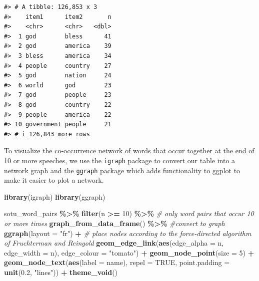 \documentclass[
]{book}
\newenvironment{Shaded}{\begin{snugshade}}{\end{snugshade}}
\newcommand{\AttributeTok}[1]{\textcolor[rgb]{0.13,0.29,0.53}{#1}}
\newcommand{\CommentTok}[1]{\textcolor[rgb]{0.56,0.35,0.01}{\textit{#1}}}
\newcommand{\ConstantTok}[1]{\textcolor[rgb]{0.56,0.35,0.01}{#1}}
\newcommand{\DecValTok}[1]{\textcolor[rgb]{0.00,0.00,0.81}{#1}}
\newcommand{\FloatTok}[1]{\textcolor[rgb]{0.00,0.00,0.81}{#1}}
\newcommand{\FunctionTok}[1]{\textcolor[rgb]{0.13,0.29,0.53}{\textbf{#1}}}
\newcommand{\NormalTok}[1]{#1}
\newcommand{\SpecialCharTok}[1]{\textcolor[rgb]{0.81,0.36,0.00}{\textbf{#1}}}
\newcommand{\StringTok}[1]{\textcolor[rgb]{0.31,0.60,0.02}{#1}}
\begin{document}
\begin{verbatim}
#> # A tibble: 126,853 x 3
#>    item1      item2       n
#>    <chr>      <chr>   <dbl>
#>  1 god        bless      41
#>  2 god        america    39
#>  3 bless      america    34
#>  4 people     country    27
#>  5 god        nation     24
#>  6 world      god        23
#>  7 god        people     23
#>  8 god        country    22
#>  9 people     america    22
#> 10 government people     21
#> # i 126,843 more rows
\end{verbatim}

To visualize the co-occurrence network of words that occur together at the end of 10 or more speeches, we use the \texttt{igraph} package to convert our table into a network graph and the \texttt{ggraph} package which adds functionality to ggplot to make it easier to plot a network.

\begin{Shaded}
\begin{Highlighting}[]
\FunctionTok{library}\NormalTok{(igraph)}
\FunctionTok{library}\NormalTok{(ggraph)}

\NormalTok{sotu\_word\_pairs }\SpecialCharTok{\%\textgreater{}\%} 
  \FunctionTok{filter}\NormalTok{(n }\SpecialCharTok{\textgreater{}=} \DecValTok{10}\NormalTok{) }\SpecialCharTok{\%\textgreater{}\%}  \CommentTok{\# only word pairs that occur 10 or more times}
  \FunctionTok{graph\_from\_data\_frame}\NormalTok{() }\SpecialCharTok{\%\textgreater{}\%} \CommentTok{\#convert to graph}
  \FunctionTok{ggraph}\NormalTok{(}\AttributeTok{layout =} \StringTok{"fr"}\NormalTok{) }\SpecialCharTok{+} \CommentTok{\# place nodes according to the force{-}directed algorithm of Fruchterman and Reingold}
  \FunctionTok{geom\_edge\_link}\NormalTok{(}\FunctionTok{aes}\NormalTok{(}\AttributeTok{edge\_alpha =}\NormalTok{ n, }\AttributeTok{edge\_width =}\NormalTok{ n), }\AttributeTok{edge\_colour =} \StringTok{"tomato"}\NormalTok{) }\SpecialCharTok{+}
  \FunctionTok{geom\_node\_point}\NormalTok{(}\AttributeTok{size =} \DecValTok{5}\NormalTok{) }\SpecialCharTok{+}
  \FunctionTok{geom\_node\_text}\NormalTok{(}\FunctionTok{aes}\NormalTok{(}\AttributeTok{label =}\NormalTok{ name), }\AttributeTok{repel =} \ConstantTok{TRUE}\NormalTok{, }
                 \AttributeTok{point.padding =} \FunctionTok{unit}\NormalTok{(}\FloatTok{0.2}\NormalTok{, }\StringTok{"lines"}\NormalTok{)) }\SpecialCharTok{+}
  \FunctionTok{theme\_void}\NormalTok{()}
\end{Highlighting}
\end{Shaded}
\end{document}
